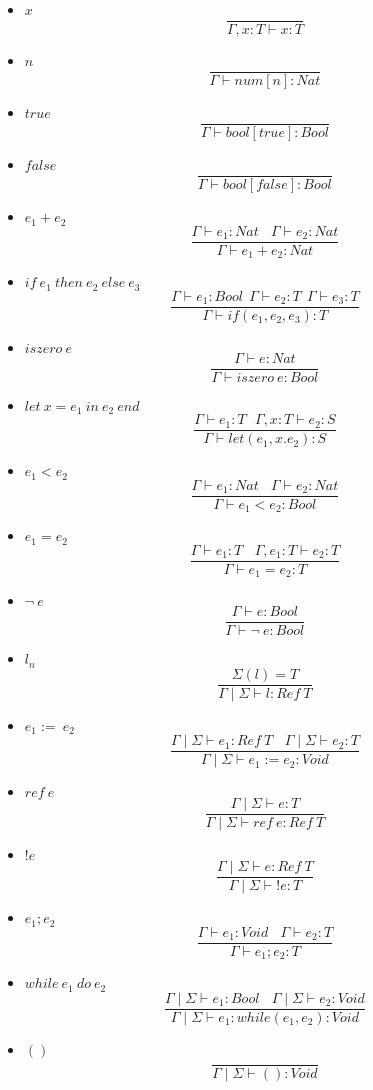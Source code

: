 \documentclass[11pt, a4paper]{report}
\begin{document}
\begin{itemize}
	\item $x$
		  $$ \frac{}{\Gamma,x:T\vdash x:T} $$
	\item $n$
		  $$ \frac{}{\Gamma\vdash num[n]:Nat} $$
	\item $true$
		  $$ \frac{}{\Gamma\vdash bool[true]:Bool} $$
	\item $false$
		  $$ \frac{}{\Gamma\vdash bool[false]:Bool} $$
	\item $e_{1}+e_{2}$
		  $$ \frac{\Gamma\vdash e_{1}:Nat\ \ \ \ \Gamma \vdash e_{2}:Nat}{\Gamma\vdash e_{1}+e_{2}:Nat} $$
	\item $if\ e_{1}\ then\ e_{2}\ else\ e_{3} $
		  $$ \frac{\Gamma\vdash e_{1}:Bool\ \ \Gamma\vdash e_{2}:T\ \ \Gamma\vdash e_{3}:T}{\Gamma\vdash if(e_{1},e_{2},e_{3}):T} $$
	\item $iszero\ e$
		  $$ \frac{\Gamma\vdash e:Nat}{\Gamma\vdash iszero\ e:Bool} $$
	\item $let\ x=e_{1}\ in\ e_{2}\ end $
		  $$ \frac{\Gamma\vdash e_{1}:T\ \ \ \Gamma,x:T\vdash e_{2}:S}{\Gamma\vdash let(e_{1},x.e_{2}):S} $$
	\item $e_{1}<e_{2}$
		  $$ \frac{\Gamma\vdash e_{1}:Nat\ \ \ \ \Gamma\vdash e_{2}:Nat}{\Gamma\vdash e_{1}<e_{2}:Bool}$$
	\item $e_{1}=e_{2}$
		  $$ \frac{\Gamma\vdash e_{1}:T\ \ \ \ \Gamma,e_{1}:T\vdash e_{2}:T}{\Gamma\vdash e_{1}=e_{2}:T} $$
	\item $\neg\ e $
		  $$ \frac{\Gamma\vdash e:Bool}{\Gamma\vdash \neg\ e:Bool} $$
	\item $l_{n}$
		  $$\frac{\Sigma(l)=T}{\Gamma\mid\Sigma\vdash l:Ref\ T} $$
	\item $e_{1}:=\ e_{2}$
		  $$\frac{\Gamma\mid\Sigma\vdash e_{1}:Ref\ T\ \ \ \ \Gamma\mid\Sigma\vdash e_{2}:T}{\Gamma\mid\Sigma\vdash e_{1}:=e_{2}:Void} $$		  
	\item $ref\ e $
		  $$\frac{\Gamma\mid\Sigma\vdash e:T}{\Gamma\mid\Sigma\vdash ref\ e:Ref\ T} $$
	\item $!e$
		  $$\frac{\Gamma\mid\Sigma\vdash e:Ref\ T}{\Gamma\mid\Sigma\vdash !e:T} $$
	\item $e_{1};e_{2} $
		  $$ \frac{\Gamma\vdash e_{1}:Void \ \ \ \ \Gamma\vdash e_{2}:T}{\Gamma\vdash e_{1};e_{2}:T} $$
	\item $while\ e_{1}\ do\ e_{2} $
		  $$\frac{\Gamma\mid\Sigma\vdash e_{1}:Bool\ \ \ \ \Gamma\mid\Sigma\vdash e_{2}:Void}{\Gamma\mid\Sigma\vdash e_{1}:while(e_{1},e_{2}):Void} $$
	\item $()$
		  $$\frac{}{\Gamma\mid\Sigma\vdash ():Void} $$
\end{itemize}
\end{document}
